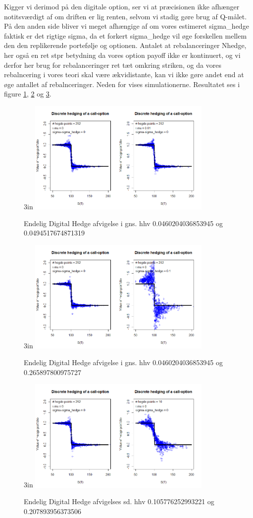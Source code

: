 \documentclass{article}
\theoremstyle{definition}
\theoremstyle{remark}
\begin{document}
Kigger vi derimod på den digitale option, ser vi at præcisionen ikke afhænger notitsværdigt af om driften er lig renten, selvom vi stadig gøre brug af Q-målet. På den anden side bliver vi meget afhængige af om vores estimeret sigma\_hedge faktisk er det rigtige sigma, da et forkert sigma\_hedge vil øge forskellen mellem den den replikerende portefølje og optionen. Antalet at rebalanceringer Nhedge, her også en ret stpr betydning da vores option payoff ikke er kontinuert, og vi derfor her brug for rebalanceringer ret tæt omkring striken, og da vores rebalncering i vores teori skal være ækvidistante, kan vi ikke gøre andet end at øge antallet af rebalnceringer. Neden for vises simulationerne. Resultatet ses i figure \ref{fig:my_label3}, \ref{fig:my_label2} og \ref{fig:my_label1}.
\begin{figure}{3in}
    \centering
    \includegraphics[width=3.5in]{Rplot21.png}
    \caption{Endelig Digital Hedge afvigelse i gns. hhv 0.0460204036853945 og 0.0494517674871319}
    \label{fig:my_label3}
\end{figure}
\begin{figure}{3in}
    \centering
    \includegraphics[width=3.5in]{Rplot22.png}
    \caption{Endelig Digital Hedge afvigelse i gns. hhv 0.0460204036853945 og 0.265897800975727}
    \label{fig:my_label2}
\end{figure}
\begin{figure}{3in}
    \centering
    \includegraphics[width=3.5in]{Rplot23.png}
    \caption{Endelig Digital Hedge afvigelses sd. hhv 0.105776252993221 og 0.207893956373506}
    \label{fig:my_label1}
\end{figure}
\end{document}
